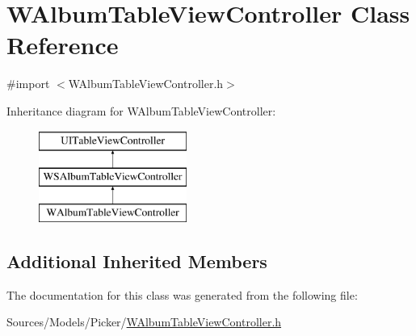 \hypertarget{interface_w_album_table_view_controller}{\section{W\-Album\-Table\-View\-Controller Class Reference}
\label{interface_w_album_table_view_controller}
}


{\ttfamily \#import $<$W\-Album\-Table\-View\-Controller.\-h$>$}

Inheritance diagram for W\-Album\-Table\-View\-Controller\-:\begin{figure}[H]
\begin{center}
\leavevmode
\includegraphics[height=3.000000cm]{interface_w_album_table_view_controller}
\end{center}
\end{figure}
\subsection*{Additional Inherited Members}


The documentation for this class was generated from the following file\-:\begin{DoxyCompactItemize}
\item 
Sources/\-Models/\-Picker/\hyperlink{_w_album_table_view_controller_8h}{W\-Album\-Table\-View\-Controller.\-h}\end{DoxyCompactItemize}
